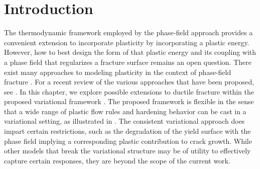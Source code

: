 \section{Introduction}
\label{section: ductile/intro}


The thermodynamic framework employed by the phase-field approach provides a convenient extension to incorporate plasticity by incorporating a plastic energy. However, how to best design the form of that plastic energy and its coupling with a phase field that regularizes a fracture surface remains an open question.
There exist many approaches to modeling plasticity in the context of phase-field fracture \cite{alessi_gradient_2014, alessi_gradient_2015, alessi_coupling_2018, ambati_phase-field_2015, ambati2016phase, miehe_phase_2016, borden2016phase, borden_phase-field_2017}.  For a recent review of the various approaches that have been proposed, see  \citet{alessi_comparison_2017}. In this chapter, we explore possible extensions to ductile fracture within the proposed variational framework . The proposed framework is flexible in the sense that a wide range of plastic flow rules and hardening behavior can be cast in a variational setting, as illustrated in \cite{ortiz_variational_1999}.  The consistent variational approach does impart certain restrictions, such as the degradation of the yield surface with the phase field implying a corresponding plastic contribution to crack growth.  While other models that break the variational structure may be of utility to effectively capture certain responses, they are beyond the scope of the current work.


